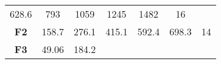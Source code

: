 \documentclass[12pt,a4paper]{article}
\begin{document}
\begin{longtable}[c]{@{}ccccccc@{}}
\begin{minipage}[t]{0.08\columnwidth}\centering\strut
628.6
\strut\end{minipage} &
\begin{minipage}[t]{0.08\columnwidth}\centering\strut
793
\strut\end{minipage} &
\begin{minipage}[t]{0.09\columnwidth}\centering\strut
1059
\strut\end{minipage} &
\begin{minipage}[t]{0.10\columnwidth}\centering\strut
1245
\strut\end{minipage} &
\begin{minipage}[t]{0.11\columnwidth}\centering\strut
1482
\strut\end{minipage} &
\begin{minipage}[t]{0.07\columnwidth}\centering\strut
16
\strut\end{minipage}\tabularnewline
\begin{minipage}[t]{0.11\columnwidth}\centering\strut
\textbf{F2}
\strut\end{minipage} &
\begin{minipage}[t]{0.08\columnwidth}\centering\strut
158.7
\strut\end{minipage} &
\begin{minipage}[t]{0.08\columnwidth}\centering\strut
276.1
\strut\end{minipage} &
\begin{minipage}[t]{0.09\columnwidth}\centering\strut
415.1
\strut\end{minipage} &
\begin{minipage}[t]{0.10\columnwidth}\centering\strut
592.4
\strut\end{minipage} &
\begin{minipage}[t]{0.11\columnwidth}\centering\strut
698.3
\strut\end{minipage} &
\begin{minipage}[t]{0.07\columnwidth}\centering\strut
14
\strut\end{minipage}\tabularnewline
\begin{minipage}[t]{0.11\columnwidth}\centering\strut
\textbf{F3}
\strut\end{minipage} &
\begin{minipage}[t]{0.08\columnwidth}\centering\strut
49.06
\strut\end{minipage} &
\begin{minipage}[t]{0.08\columnwidth}\centering\strut
184.2
\strut\end{minipage} &

\end{longtable}
\end{document}
